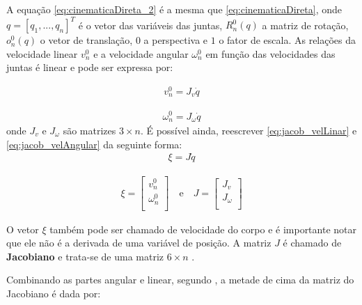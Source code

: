 A equação \eqref{eq:cinematicaDireta_2} é a mesma que \eqref{eq:cinematicaDireta}, onde $q = [q_1,...,q_n]^T$ é o vetor das 
variáveis das juntas, $R^{0}_n(q)$ a matriz de rotação, $o^{0}_n(q)$ o vetor de translação, $0$ a perspectiva e $1$ o 
fator de escala. As relações da velocidade linear $v^0_n$ e a velocidade angular $\omega^0_n$ em função das velocidades 
das juntas é linear \cite{siciliano} e pode ser expressa por:

\begin{equation}
  \begin{gathered}
    v^0_n = J_v \dot{q}
  \end{gathered}
  \label{eq:jacob_velLinar}
\end{equation}

\begin{equation}
  \begin{gathered}
    \omega^0_n = J_\omega \dot{q}
  \end{gathered}
  \label{eq:jacob_velAngular}
\end{equation}
onde $J_v$ e $J_\omega$ são matrizes $3 \times n$. É possível ainda, reescrever \eqref{eq:jacob_velLinar} e
\eqref{eq:jacob_velAngular} da seguinte forma:
\begin{equation}
  \begin{gathered}
    \xi = J\dot{q}
  \end{gathered}
  \label{eq:jacob_ambos}
\end{equation}

\begin{equation}
  \begin{gathered}
    \xi = \begin{bmatrix}
     v^0_n\\
     \omega^0_n\\
    \end{bmatrix}
    \quad \textrm{e} \quad 
    J = \begin{bmatrix}
     J_v\\
     J_\omega\\
    \end{bmatrix}
  \end{gathered}
\end{equation}

O vetor $\xi$ também pode ser chamado de velocidade do corpo \cite{Spong} e é importante notar que
ele não é a derivada de uma variável de posição. A matriz $J$ é chamado de \textbf{Jacobiano} e trata-se
de uma matriz $6 \times n$ .

Combinando as partes angular e linear, segundo , a metade de cima da matriz do Jacobiano é
dada por:

